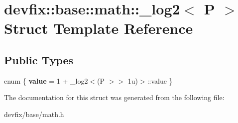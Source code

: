 \hypertarget{structdevfix_1_1base_1_1math_1_1__log2}{}\section{devfix\+:\+:base\+:\+:math\+:\+:\+\_\+log2$<$ P $>$ Struct Template Reference}
\label{structdevfix_1_1base_1_1math_1_1__log2}
\subsection*{Public Types}
\begin{DoxyCompactItemize}
\item 
\mbox{\label{structdevfix_1_1base_1_1math_1_1__log2_a365a70e975843305e3c66d0a19ef3206}} 
enum \{ {\bfseries value} = 1 + \+\_\+log2$<$(P $>$$>$ 1u)$>$\+:\+:value
 \}
\end{DoxyCompactItemize}


The documentation for this struct was generated from the following file\+:\begin{DoxyCompactItemize}
\item 
devfix/base/math.\+h\end{DoxyCompactItemize}
